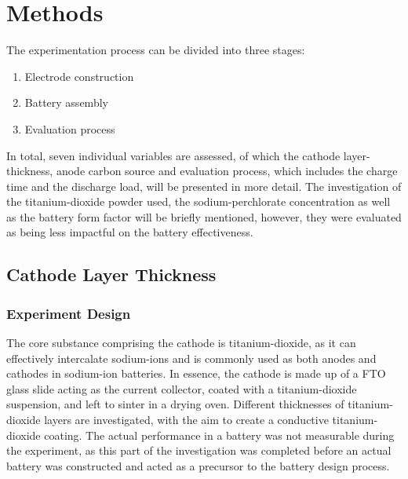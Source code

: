 \section{Methods}
The experimentation process can be divided into three stages: 
\begin{enumerate}
    \item Electrode construction
    \item Battery assembly
    \item Evaluation process
\end{enumerate}

In total, seven individual variables are assessed, of which the cathode layer-thickness, anode carbon source and evaluation process, which includes the charge time and the discharge load, will be presented in more detail. The investigation of the titanium-dioxide powder used, the sodium-perchlorate concentration as well as the battery form factor will be briefly mentioned, however, they were evaluated as being less impactful on the battery effectiveness.

\subsection{Cathode Layer Thickness}
\subsubsection{Experiment Design}
The core substance comprising the cathode is titanium-dioxide, as it can effectively intercalate sodium-ions and is commonly used as both anodes and cathodes in sodium-ion batteries\cite{Guo2016}.
In essence, the cathode is made up of a FTO glass slide acting as the current collector, coated with a titanium-dioxide suspension, and left to sinter in a drying oven. Different thicknesses of titanium-dioxide layers are investigated, with the aim to create a conductive titanium-dioxide coating. The actual performance in a battery was not measurable during the experiment, as this part of the investigation was completed before an actual battery was constructed and acted as a precursor to the battery design process.

